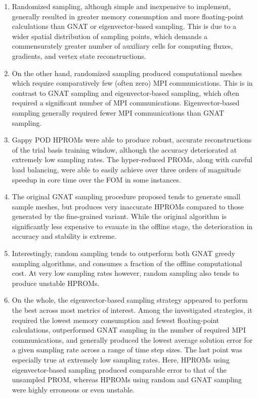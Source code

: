\begin{enumerate}
    \item Randomized sampling, although simple and inexpensive to implement, generally resulted in greater memory consumption and more floating-point calculations than GNAT or eigenvector-based sampling. This is due to a wider spatial distribution of sampling points, which demands a commensurately greater number of auxiliary cells for computing fluxes, gradients, and vertex state reconstructions.
    \item On the other hand, randomized sampling produced computational meshes which require comparatively few (often zero) MPI communications. This is in contrast to GNAT sampling and eigenvector-based sampling, which often required a significant number of MPI communications. Eigenvector-based sampling generally required fewer MPI communications than GNAT sampling.
    \item Gappy POD HPROMs were able to produce robust, accurate reconstructions of the trial basis training window, although the accuracy deteriorated at extremely low sampling rates. The hyper-reduced PROMs, along with careful load balancing, were able to easily achieve over three orders of magnitude speedup in core time over the FOM in some instances.
    \item The original GNAT sampling procedure proposed tends to generate small sample meshes, but produces very inaccurate HPROMs compared to those generated by the fine-grained variant. While the original algorithm is significantly less expensive to evauate in the offline stage, the deterioration in accuracy and stability is extreme.
    \item Interestingly, random sampling tends to outperform both GNAT greedy sampling algorithms, and consumes a fraction of the offline computational cost. At very low sampling rates however, random sampling also tends to produce unstable HPROMs.
    \item On the whole, the eigenvector-based sampling strategy appeared to perform the best across most metrics of interest. Among the investigated strategies, it required the lowest memory consumption and fewest floating-point calculations, outperformed GNAT sampling in the number of required MPI communications, and generally produced the lowest average solution error for a given sampling rate across a range of time step sizes. The last point was especially true at extremely low sampling rates. Here, HPROMs using eigenvector-based sampling produced comparable error to that of the unsampled PROM, whereas HPROMs using random and GNAT sampling were highly erroneous or even unstable.

\end{enumerate}
